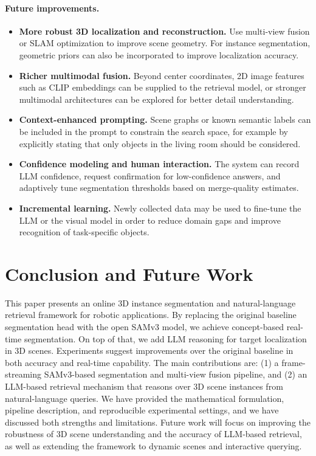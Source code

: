 \documentclass[12pt,a4paper]{article}
\begin{document}
\paragraph{Future improvements.}
\begin{itemize}[leftmargin=2em]
  \item \textbf{More robust 3D localization and reconstruction.} Use multi-view fusion or SLAM optimization to improve scene geometry. For instance segmentation, geometric priors can also be incorporated to improve localization accuracy.
  \item \textbf{Richer multimodal fusion.} Beyond center coordinates, 2D image features such as CLIP embeddings can be supplied to the retrieval model, or stronger multimodal architectures can be explored for better detail understanding.
  \item \textbf{Context-enhanced prompting.} Scene graphs or known semantic labels can be included in the prompt to constrain the search space, for example by explicitly stating that only objects in the living room should be considered.
  \item \textbf{Confidence modeling and human interaction.} The system can record LLM confidence, request confirmation for low-confidence answers, and adaptively tune segmentation thresholds based on merge-quality estimates.
  \item \textbf{Incremental learning.} Newly collected data may be used to fine-tune the LLM or the visual model in order to reduce domain gaps and improve recognition of task-specific objects.
\end{itemize}

\section{Conclusion and Future Work}

This paper presents an online 3D instance segmentation and natural-language retrieval framework for robotic applications. By replacing the original baseline segmentation head with the open SAMv3 model, we achieve concept-based real-time segmentation. On top of that, we add LLM reasoning for target localization in 3D scenes. Experiments suggest improvements over the original baseline in both accuracy and real-time capability. The main contributions are: (1) a frame-streaming SAMv3-based segmentation and multi-view fusion pipeline, and (2) an LLM-based retrieval mechanism that reasons over 3D scene instances from natural-language queries. We have provided the mathematical formulation, pipeline description, and reproducible experimental settings, and we have discussed both strengths and limitations. Future work will focus on improving the robustness of 3D scene understanding and the accuracy of LLM-based retrieval, as well as extending the framework to dynamic scenes and interactive querying.
\end{document}
